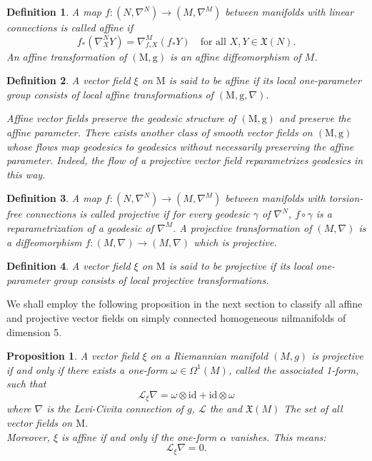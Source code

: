 \documentclass[10pt]{article}
\newtheorem{Definition}{Definition}
\newtheorem{Proposition}{Proposition}
\begin{document}
\begin{Definition}
A map \(f : (N, \nabla^N) \to (M, \nabla^M)\) between manifolds with linear connections is called \emph{affine} if
\[
f_* (\nabla^N_X Y) = \nabla^M_{f_* X}(f_* Y)
\quad\text{for all }X,Y \in \mathfrak{X}(N).
\]
An \emph{affine transformation} of \((\mathrm{M},\mathrm{g})\) is an affine diffeomorphism of \(M\).
\end{Definition}

\begin{Definition} A vector field \(\xi\) on $\mathrm{M}$ is said to be affine if its local one-parameter group consists of local affine transformations of \((\mathrm{M}, \mathrm{g}, \nabla)\). 

Affine vector fields preserve the geodesic structure of \((\mathrm{M},\mathrm{g})\) and preserve the affine parameter.
There exists another class of smooth vector fields on $(\mathrm{M},\mathrm{g})$ whose flows map geodesics to geodesics without necessarily preserving the affine parameter. Indeed, the flow of a \emph{projective vector field} reparametrizes geodesics in this way.
\end{Definition}

\begin{Definition}
A map \(f : (N, \nabla^N) \to (M, \nabla^M)\) between manifolds with torsion-free connections is called \emph{projective} if for every geodesic \(\gamma\) of \(\nabla^N\), \(f \circ \gamma\) is a reparametrization of a geodesic of \(\nabla^M\). A \emph{projective transformation} of \((M, \nabla)\) is a diffeomorphism \(f : (M, \nabla) \to (M, \nabla)\) which is projective.
\end{Definition}

\begin{Definition}
A vector field \(\xi\) on $\mathrm{M}$ is said to be projective if its local one-parameter group consists of local projective transformations.
\end{Definition}
We shall employ the following proposition in the next section to classify all affine and projective vector fields on simply connected homogeneous nilmanifolds of dimension 5.

\begin{Proposition} \cite{w}
A vector field \(\xi\) on a Riemannian manifold \((M,g)\) is projective if and only if there exists a one-form \(\omega \in \Omega^1(M)\), called the \emph{associated 1-form}, such that
\begin{equation}\label{proj}
\mathscr{L}_\xi \nabla = \omega \otimes \text{id} + \text{id} \otimes \omega
\end{equation}
where \(\nabla\) is the Levi-Civita connection of \(g\), $\mathscr{L}$ the  and $\mathfrak{X}(M)$ The set of all vector fields on $\mathrm{M}$.\\
Moreover, \(\xi\) is affine if and only if the one-form \(\alpha \) vanishes. This means:
\begin{equation}\label{aff}
\mathscr{L}_\xi \nabla
=0.
\end{equation}
\end{Proposition}
\end{document}
